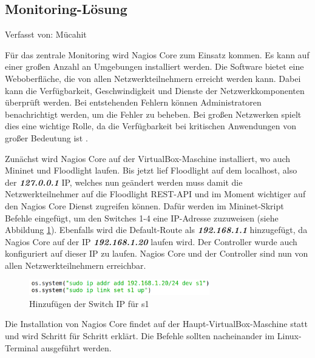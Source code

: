 \documentclass[fontsize=12pt,paper=a4,open=any,parskip=half,
  twoside=false,toc=listof,toc=bibliography,fleqn,leqno,
  captions=nooneline,captions=tableabove,british]{scrbook}
\begin{document}
\subsection{Monitoring-Lösung}
{\tiny Verfasst von: Mücahit\par}
Für das zentrale Monitoring wird Nagios Core zum Einsatz kommen. Es kann auf einer großen Anzahl an Umgebungen installiert werden. Die Software bietet eine Weboberfläche, die von allen Netzwerkteilnehmern erreicht werden kann. Dabei kann die Verfügbarkeit, Geschwindigkeit und Dienste der Netzwerkkomponenten überprüft werden. Bei entstehenden Fehlern können Administratoren benachrichtigt werden, um die Fehler zu beheben. Bei großen Netzwerken spielt dies eine wichtige Rolle, da die Verfügbarkeit bei kritischen Anwendungen von großer Bedeutung ist \cite{nagiosdef}.\par
Zunächst wird Nagios Core auf der VirtualBox-Maschine installiert, wo auch Mininet und Floodlight laufen. Bis jetzt lief Floodlight auf dem localhost, also der \textit{\textbf{127.0.0.1}} IP, welches nun geändert werden muss damit die Netzwerkteilnehmer auf die Floodlight REST-API und im Moment wichtiger auf den Nagios Core Dienst zugreifen können. Dafür werden im Mininet-Skript Befehle eingefügt, um den Switches 1-4 eine IP-Adresse zuzuweisen (siehe Abbildung \ref{switch}). Ebenfalls wird die Default-Route als \textit{\textbf{192.168.1.1}} hinzugefügt, da Nagios Core auf der IP \textit{\textbf{192.168.1.20}} laufen wird. Der Controller wurde auch konfiguriert auf dieser IP zu laufen. Nagios Core und der Controller sind nun von allen Netzwerkteilnehmern erreichbar.

\begin{figure}[H]
 \centering
 \includegraphics[width=0.7\textwidth]{Bilder/switch}
 \captionsetup{justification=centering, margin=2cm}
 \caption{Hinzufügen der Switch IP für s1}
 \label{switch}
\end{figure}
 
Die Installation von Nagios Core findet auf der Haupt-VirtualBox-Maschine statt und wird Schritt für Schritt erklärt. Die Befehle sollten nacheinander im Linux-Terminal ausgeführt werden.

\newlength\myboxwidth

\setlength{\myboxwidth}{\dimexpr\textwidth-2\fboxsep}
\end{document}
